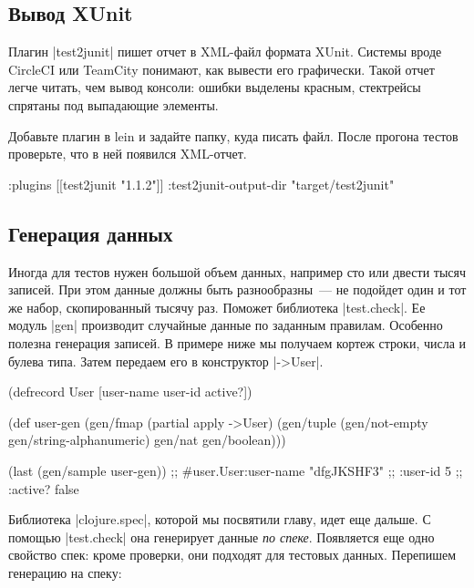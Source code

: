 \subsection{Вывод XUnit}

Плагин \spverb|test2junit|
пишет отчет в XML-файл формата XUnit. Системы вроде CircleCI или TeamCity
понимают, как вывести его графически. Такой отчет легче читать, чем вывод
консоли: ошибки выделены красным, стектрейсы спрятаны под выпадающие
элементы.

Добавьте плагин в lein и задайте папку, куда писать файл. После прогона тестов
проверьте, что в ней появился XML-отчет.

\begin{english}
  \begin{clojure}
:plugins [[test2junit "1.1.2"]]
:test2junit-output-dir "target/test2junit"
  \end{clojure}
\end{english}

\subsection{Генерация данных}

Иногда для тестов нужен большой объем данных, например сто или двести тысяч
записей. При этом данные должны быть разнообразны~--- не подойдет один и тот же
набор, скопированный тысячу раз. Поможет библиотека \spverb|test.check|. Ее
модуль \spverb|gen| производит случайные данные по заданным правилам. Особенно
полезна генерация записей. В примере ниже мы получаем кортеж строки, числа и
булева типа. Затем передаем его в конструктор \spverb|->User|.

\begin{english}
  \begin{clojure}
(defrecord User [user-name user-id active?])

(def user-gen
  (gen/fmap (partial apply ->User)
            (gen/tuple (gen/not-empty gen/string-alphanumeric)
                       gen/nat
                       gen/boolean)))

(last (gen/sample user-gen))
;; #user.User{:user-name "dfgJKSHF3"
;;            :user-id 5
;;            :active? false}
  \end{clojure}
\end{english}

Библиотека \spverb|clojure.spec|, которой мы посвятили главу, идет еще дальше. С
помощью \spverb|test.check| она генерирует данные \emph{по спеке}. Появляется
еще одно свойство спек: кроме проверки, они подходят для тестовых
данных. Перепишем генерацию на спеку:

